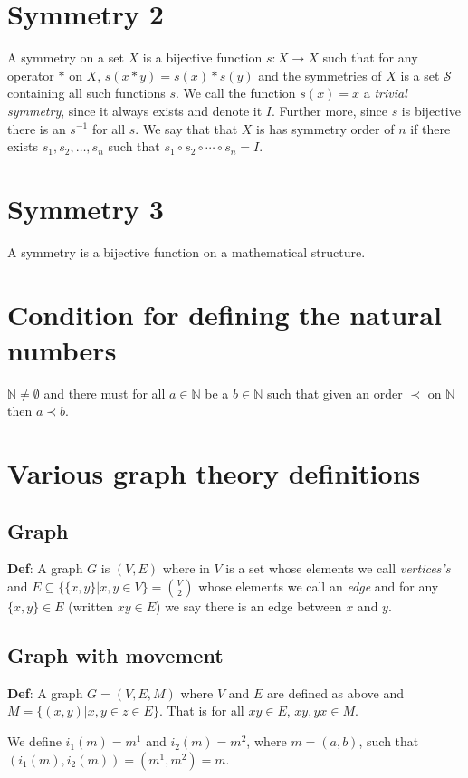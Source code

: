 \documentclass{article}
\begin{document}
\section{Symmetry 2}
A symmetry on a set $X$ is a bijective function $s: X \rightarrow X$ such that
for any operator $*$ on $X$, $s(x * y) = s(x) * s(y)$ and the
symmetries of $X$ is a set $\mathcal{S}$ containing all such functions $s$. 
We call the function $s(x)=x$ a \textit{trivial symmetry}, since it always 
exists and denote it $I$. Further more, since $s$ is bijective there is an $s^{-1}$ 
for all $s$. We say that that $X$ is has symmetry order of $n$ if there exists
$s_1,s_2,\dots,s_n$ such that $s_1 \circ s_2 \circ \cdots \circ s_n = I$. 

\section{Symmetry 3}
A symmetry is a bijective function on a mathematical structure.

\section{Condition for defining the natural numbers}
$\mathbb{N} \neq \emptyset$ and there must for all $a \in \mathbb{N}$ be a $b \in 
\mathbb{N}$ such that given an order $\prec$ on $\mathbb{N}$ then $a \prec b$.

\section{Various graph theory definitions}
\subsection{Graph}
\textbf{Def}: A graph $G$ is $(V,E)$ where in $V$ is a set whose elements we
call \textit{vertices's} and $E \subseteq \{\{x,y\}| x,y \in V\} = \binom{V}{2}$ 
whose elements we call an \textit{edge} and for any $\{x,y\} \in E$ 
(written $xy \in E$) we say there is an edge between $x$ and $y$. 

\subsection{Graph with movement}
\textbf{Def}: A graph $G=(V,E,M)$ where $V$ and $E$ are defined as above and 
$M = \{(x,y)| x,y \in z \in E\}$. That is for all $xy \in E$, $xy, yx \in M$.

We define $i_1(m) = m^1$ and $i_2(m) = m^2$, where $m = (a,b)$, such that 
$(i_1(m),i_2(m)) = (m^1,m^2) = m$.
\end{document}
